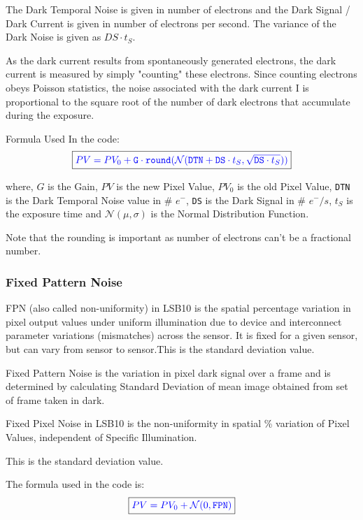 \documentclass[../../main.tex]{subfiles}
\begin{document}
The Dark Temporal Noise is given in number of electrons and the Dark Signal / Dark Current is given in number of electrons per second. The variance of the Dark Noise is given as $DS \cdot t_S$.

As the dark current results from spontaneously generated electrons, the dark current is measured by simply "counting" these electrons. Since counting electrons obeys Poisson statistics, the noise associated with the dark current I is proportional to the square root of the number of dark electrons that accumulate during the exposure. 

Formula Used In the code:  
\begin{equation}
    \boxed{ \color{blue} PV = PV_0 + \texttt{G} \cdot \texttt{round}(\mathcal{N}(\texttt{DTN} + \texttt{DS} \cdot t_S, \sqrt{\texttt{DS} \cdot t_S}))   \color{black}}
\end{equation}

where, $G$ is the Gain, $PV$ is the new Pixel Value, $PV_0$ is the old Pixel Value, \texttt{DTN} is the Dark Temporal Noise value in \# $e^-$, \texttt{DS} is the Dark Signal in \# $e^-/s$, $t_S$ is the exposure time and $\mathcal{N}(\mu, \sigma)$ is the Normal Distribution Function.

Note that the rounding is important as number of electrons can't be a fractional number. 


\subsubsection{Fixed Pattern Noise} %
FPN (also called non-uniformity) in LSB10 is the spatial percentage variation in pixel output values under uniform illumination due to device and interconnect parameter variations (mismatches) across the sensor. It is fixed for a given sensor, but can vary from sensor to sensor.This is the standard deviation value.

Fixed Pattern Noise is the variation in pixel dark signal over a frame and is determined by calculating Standard Deviation of mean image obtained from set of frame taken in dark.

Fixed Pixel Noise in LSB10 is the non-uniformity in spatial \% variation of
Pixel Values, independent of Specific Illumination.

This is the standard deviation value.

The formula used in the code is:
\begin{equation}
    \boxed{ \color{blue} PV = PV_0 + \mathcal{N}(0, \texttt{FPN})   \color{black}}
\end{equation}
\end{document}
